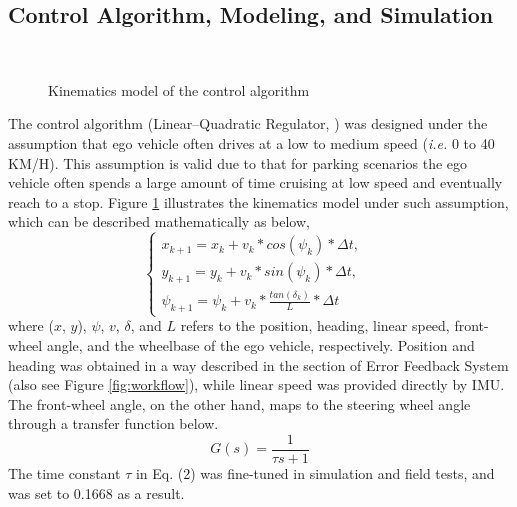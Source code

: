 \documentclass[letterpaper, 10 pt, conference]{ieeeconf}
\begin{document}
\subsection{Control Algorithm, Modeling, and Simulation}
\begin{figure}[thpb!]
\vspace{-0.cm}
\small
\centering
     \\    
  \caption{Kinematics model of the control algorithm}
  \label{fig:model}
  \scriptsize{}
\end{figure}
The control algorithm (Linear–Quadratic Regulator, \cite{LQR1974}) was designed under the assumption that ego vehicle often drives at a low to medium speed (\textit{i.e.} 0 to 40 KM/H). This assumption is valid due to that for parking scenarios the ego vehicle often spends a large amount of time cruising at low speed and eventually reach to a stop. Figure \ref{fig:model} illustrates the kinematics model under such assumption, which can be described mathematically as below,
\begin{equation}
\left\{
             \begin{array}{lr}
             x_{k+1} = x_{k} + v_k * cos(\psi_{k}) * \Delta t, &  \\
             y_{k+1} = y_{k} + v_k * sin(\psi_{k}) * \Delta t, & \\
             \psi_{k+1} = \psi_{k} + v_k * \frac{tan(\delta_k)}{L} * \Delta t &  
             \end{array}
\right.
\label{eq:model}
\end{equation}
where ($x$, $y$), $\psi$, $v$, $\delta$, and $L$ refers to the position, heading, linear speed, front-wheel angle, and the wheelbase of the ego vehicle, respectively.
Position and heading was obtained in a way described in the section of Error Feedback System (also see Figure \ref{fig:workflow}), while linear speed was provided directly by IMU. 
The front-wheel angle, on the other hand, maps to the steering wheel angle through a transfer function below.
\begin{equation}
    G(s) = \frac{1}{\tau s+1}
\end{equation}
The time constant $\tau$ in Eq. (2) was fine-tuned in simulation and field tests, and was set to 0.1668 as a result.
\end{document}
